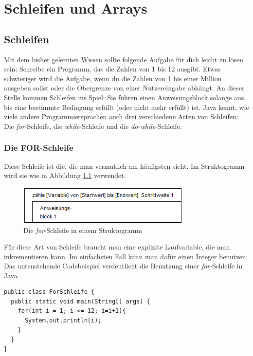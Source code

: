 \chapter{Schleifen und Arrays}

\section{Schleifen}

Mit dem bisher gelernten Wissen sollte folgende Aufgabe für dich leicht zu lösen sein: Schreibe ein Programm, das die Zahlen von 1 bis 12 ausgibt. Etwas schwieriger wird die Aufgabe, wenn du die Zahlen von 1 bis einer Million ausgeben sollst oder die Obergrenze von einer Nutzereingabe abhängt. An dieser Stelle kommen Schleifen ins Spiel: Sie führen einen Anweisungsblock solange aus, bis eine bestimmte Bedingung erfüllt (oder nicht mehr erfüllt) ist. Java kennt, wie viele andere Programmiersprachen auch drei verschiedene Arten von Schleifen: Die \textit{for}-Schleife, die \textit{while}-Schleife und die \textit{do-while}-Schleife.

\subsection{Die FOR-Schleife}

Diese Schleife ist die, die man vermutlich am häufigsten sieht. Im Struktogramm wird sie wie in Abbildung \ref{for} verwendet.

\begin{figure}
	\begin{center}\includegraphics[scale=1]{images/for.png}\end{center}
	\caption{Die \textit{for}-Schleife in einem Struktogramm}
	\label{for}
\end{figure}

Für diese Art von Schleife braucht man eine explizite Laufvariable, die man inkrementieren kann. Im einfachsten Fall kann man dafür einen Integer benutzen. Das untenstehende Codebeispiel verdeutlicht die Benutzung einer \textit{for}-Schleife in Java.

\begin{minipage}{\textwidth}
\begin{lstlisting}
public class ForSchleife {
  public static void main(String[] args) {
    for(int i = 1; i <= 12; i=i+1){
      System.out.println(i);
    }
  }
}
\end{lstlisting}
\end{minipage}

